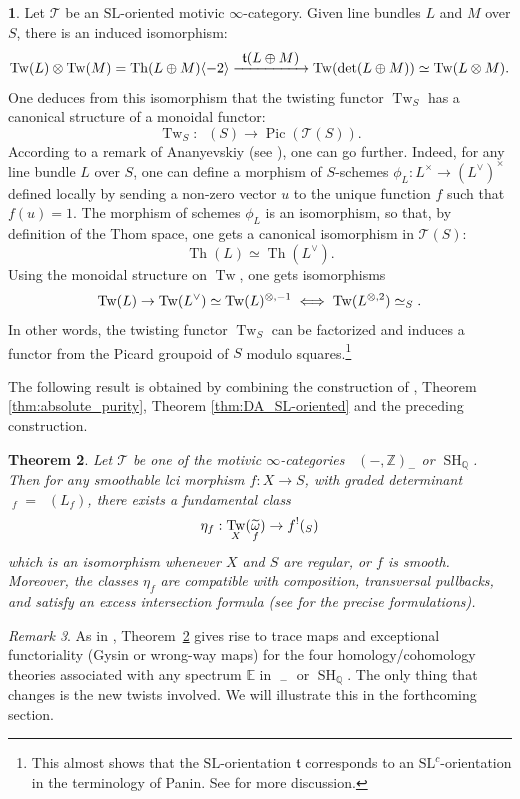 \documentclass[11pt]{article}
\makeatletter
\numberwithin{equation}{section}\renewcommand{\encodingdefault}{TU}
\def\To#1{\mathchoice{\xrightarrow{\textstyle\kern4pt#1\kern3pt}}{\stackrel{#1}{\longrightarrow}}{}{}}
\DeclareRobustCommand{\mathbbm}[1]{\csname jepbb@#1\endcsname}
\newcommand{\T}{\mathscr T}
\DeclareMathOperator{\uPic}{\underline{Pic}}
\renewcommand{\AA}{\mathbb A}
\newcommand{\E}{\mathbb E}
\newcommand{\un}{\mathbbm 1}
\newcommand{\SL}{\mathrm{SL}}
\newcommand{\thom}{\mathfrak t}
\DeclareMathOperator{\SH}{SH}
\DeclareMathOperator{\DA}{D_{\AA^1}}
\DeclareMathOperator{\Pic}{Pic}
\newcommand{\twist}[1]{\langle #1 \rangle}
\DeclareMathOperator{\Th}{Th}
\DeclareMathOperator{\Tw}{Tw}
\DeclareMathOperator{\tdet}{\widetilde \det}
\DeclareMathOperator{\tomega}{\widetilde \omega}
\newcommand{\ZZ} {\mathbb Z}
\newcommand{\QQ} {\mathbb Q}
\newtheorem{thm}{Theorem}[section]
\theoremstyle{remark}
\newtheorem{rem}[thm]{Remark}
\theoremstyle{definition}
\newtheorem{num}[thm]{}
\numberwithin{equation}{thm}
\makeatother
\begin{document}
\begin{num}
Let $\T$ be an $\SL$-oriented motivic $\infty$-category.
Given line bundles $L$ and $M$ over $S$, there is an induced isomorphism:
\[
\Tw(L) \otimes \Tw(M)=\Th(L \oplus M)\twist{-2}
\To{\thom(L \oplus M)} \Tw(\det(L \oplus M))\simeq \Tw(L \otimes M).
\]
One deduces from this isomorphism that the twisting functor $\Tw_S$ has
a canonical structure of a monoidal functor:
\[
\Tw_S:\uPic(S) \to \Pic(\T(S)).
\]
According to a remark of Ananyevskiy (see \cite[Lem.\,4.1]{AnaSL}),
one can go further.
Indeed, for any line bundle $L$ over $S$,
one can define a morphism of $S$-schemes
\hbox{$\phi_L:L^\times \to (L^\vee)^\times$} defined locally by sending a non-zero vector $u$
to the unique function $f$ such that $f(u)=1$.
The morphism of schemes $\phi_L$ is an isomorphism, so that, by definition of the Thom space, one gets
a canonical isomorphism in $\T(S)$:
\[
\Th(L) \simeq \Th(L^\vee).
\]
Using the monoidal structure on $\Tw$,
one gets isomorphisms
\[
\Tw(L) \to \Tw(L^\vee) \simeq \Tw(L)^{\otimes,-1}
\iff
\Tw(L^{\otimes,2}) \simeq \un_S.
\]
In other words, the twisting functor $\Tw_S$ can be factorized and induces a functor from the Picard groupoid
of $S$ modulo squares.\footnote{This almost shows that the $\SL$-orientation $\thom$ corresponds to an $\SL^c$-orientation
in the terminology of Panin. See \cite[Rem.\,4.4]{AnaSL} for more discussion.}
\end{num}

The following result is obtained by combining the construction of \cite{DJK},
Theorem \ref{thm:absolute_purity}, Theorem \ref{thm:DA_SL-oriented} and the preceding
construction.
\begin{thm}\label{thm:SLoriented_absolute_purity}
Let $\T$ be one of the motivic $\infty$-categories $\DA(-,\ZZ)_-$ or $\SH_\QQ$.
Then for any smoothable lci morphism $f:X \to S$,
with graded determinant $\tomega_f=\tdet(L_f)$,
there exists a fundamental class
\[
\eta_f:\Tw_X(\tomega_f) \to f^!(\un_S)
\]
which is an isomorphism whenever $X$ and $S$ are regular, or $f$ is smooth.
Moreover, the classes $\eta_f$ are compatible with composition, transversal pullbacks, and satisfy an excess intersection formula (see \cite{DJK} for the precise formulations).
\end{thm}

\begin{rem}
As in \cite{DJK}, Theorem~\ref{thm:SLoriented_absolute_purity} gives rise to trace maps and exceptional functoriality (Gysin or wrong-way maps) for the four homology/cohomology theories associated with any spectrum $\E$ in $\DA_-$ or $\SH_\QQ$.
The only thing that changes is the new twists involved.
We will illustrate this in the forthcoming section.
\end{rem}
\end{document}
